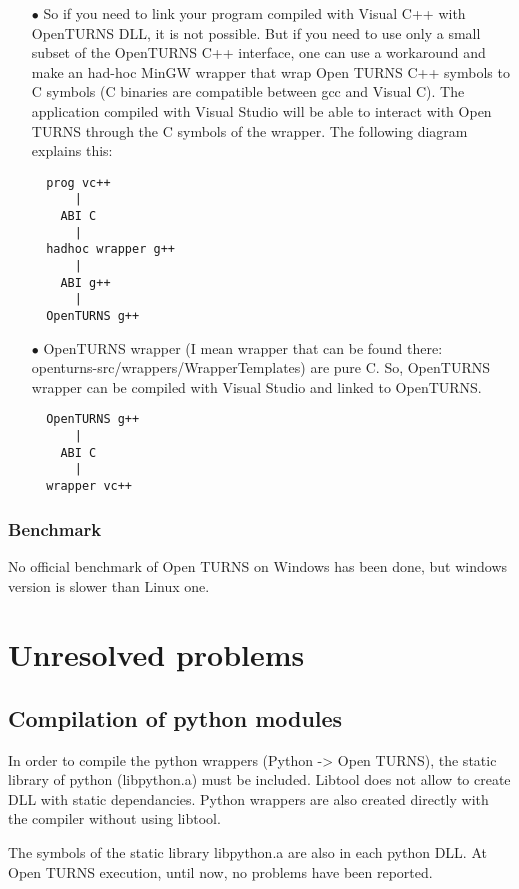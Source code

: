 \documentclass[11pt]{article}
\begin{document}
\begin{itemize}
\item[$\bullet$] So if you need to link your program compiled with Visual C++ with OpenTURNS DLL, it is not possible. 
But if you need to use only a small subset of the OpenTURNS C++ interface, one can use a workaround and make an had-hoc MinGW wrapper that wrap Open TURNS C++ symbols to C symbols (C binaries are compatible between gcc and Visual C). The application compiled with Visual Studio will be able to interact with Open TURNS through the C symbols of the wrapper. The following diagram explains this:
\begin{verbatim}
  prog vc++  
      |
    ABI C
      |
  hadhoc wrapper g++
      |
    ABI g++
      |
  OpenTURNS g++
\end{verbatim}

\item[$\bullet$] OpenTURNS wrapper (I mean wrapper that can be found there: openturns-src/wrappers/WrapperTemplates) are pure C. 
So, OpenTURNS wrapper can be compiled with Visual Studio and linked to OpenTURNS.
\begin{verbatim}
  OpenTURNS g++
      |
    ABI C
      |
  wrapper vc++  
\end{verbatim}
\end{itemize}

\subsubsection{Benchmark}

No official benchmark of Open TURNS on Windows has been done, but windows version is slower than Linux one.


\section{Unresolved problems}


\subsection{Compilation of python modules}

In order to compile the python wrappers (Python -> Open TURNS), the static library of python (libpython.a) must be included. Libtool does not allow to create DLL with static dependancies. Python wrappers are also created directly with the compiler without using libtool.

The symbols of the static library libpython.a are also in each python DLL. At Open TURNS execution, until now, no problems have been reported.
\end{document}
